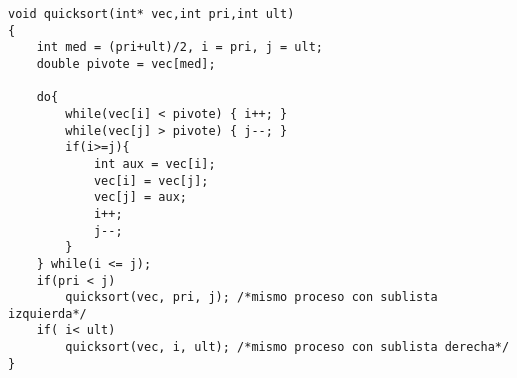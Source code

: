 \begin{lstlisting}
void quicksort(int* vec,int pri,int ult)
{
    int med = (pri+ult)/2, i = pri, j = ult;
    double pivote = vec[med];

    do{   
        while(vec[i] < pivote) { i++; }
        while(vec[j] > pivote) { j--; }
        if(i>=j){
            int aux = vec[i];
            vec[i] = vec[j];
            vec[j] = aux;
            i++;
            j--;
        }
    } while(i <= j);
    if(pri < j)
        quicksort(vec, pri, j); /*mismo proceso con sublista izquierda*/
    if( i< ult)
        quicksort(vec, i, ult); /*mismo proceso con sublista derecha*/
}
\end{lstlisting}